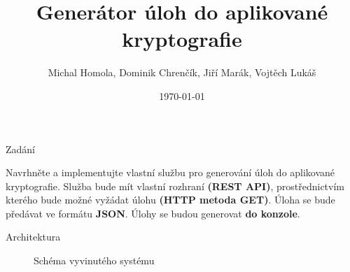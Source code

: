\documentclass[aspectratio=1610]{beamer}
\title[Generátor úloh do aplikované kryptografie]
{Generátor úloh do aplikované kryptografie}
\author[ Homola, Chrenčík, Marák, Lukáš]
{Michal Homola, Dominik Chrenčík, Jiří Marák, Vojtěch Lukáš}
\institute
{MPC-KRY \\
Ústav telekomunikací  \\
VUT v Brně
}
\date{\today}
\begin{document}

\begin{frame}
    \titlepage
\end{frame}


\begin{frame}{Zadání}
    \begin{alertblock}{}
        Navrhněte a implementujte vlastní službu pro generování úloh do aplikované kryptografie. Služba bude mít vlastní rozhraní \textbf{(REST API)}, prostřednictvím kterého bude možné vyžádat úlohu \textbf{(HTTP metoda GET)}. Úloha se bude předávat ve formátu \textbf{JSON}. Úlohy se budou generovat \textbf{do konzole}. 
    \end{alertblock}
\end{frame}

\begin{frame}{Architektura}
    \begin{figure}
        \centering
        
        
        \caption{Schéma vyvinutého systému}
    \end{figure}
\end{frame}
\end{document}
